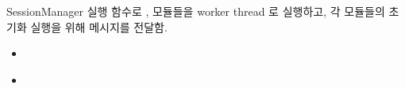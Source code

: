 \documentclass[a4paper,10pt,english]{sphinxmanual}
\begin{document}
\begin{fulllineitems}
\begin{fulllineitems}
\begin{quote}
\begin{description}
\begin{itemize}
\end{itemize}

\end{description}\end{quote}

\end{fulllineitems}


\begin{fulllineitems}
\label{\detokenize{_SessionManager:SessionManager.run}}
\pysigstartsignatures
{}
\pysigstopsignatures
\sphinxAtStartPar
SessionManager 실행 함수로 {\hyperref[\detokenize{_SessionRequester:sessionrequester}]{}}, {\hyperref[\detokenize{_SessionListener:sessionlistener}]{}} 모듈들을 worker thread 로 실행하고,
각 모듈들의 초기화 실행을 위해  메시지를 전달함.


\nopagebreak

\begin{itemize}
\item {} 
\sphinxAtStartPar
{\hyperref[\detokenize{_SessionRequester:sessionrequester}]{}}

\item {} 
\sphinxAtStartPar
{\hyperref[\detokenize{_SessionListener:sessionlistener}]{}}

\end{itemize}



\end{fulllineitems}


\end{fulllineitems}


\sphinxstepscope
\end{document}
